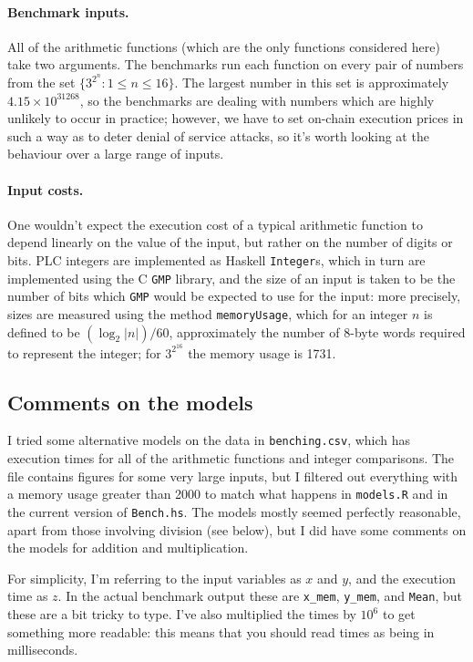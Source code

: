 \documentclass[a4paper]{article}
\begin{document}
\paragraph{Benchmark inputs.}  All of the arithmetic functions (which
are the only functions considered here) take two arguments.  The
benchmarks run each function on every pair of numbers from the set
$\{3^{2^n}: 1 \leq n \leq 16\}$.  The largest number in this
set is approximately $4.15 \times 10^{31268}$, so the benchmarks are dealing
with numbers which are highly unlikely to occur in practice; however,
we have to set on-chain execution prices in such a way as to deter denial 
of service attacks, so it's worth looking at the behaviour over a large
range of inputs.

\paragraph{Input costs.}  One wouldn't expect the execution cost
of a typical arithmetic function to depend linearly on the value of the
input, but rather on the number of digits or bits.  PLC integers are
implemented as Haskell \verb|Integer|s, which in turn are implemented
using the C \texttt{GMP} library, and the size of an input is taken to
be the number of bits which \texttt{GMP} would be expected to use for the
input: more precisely, sizes are measured using the method
\verb|memoryUsage|, which for an integer $n$ is defined to be $(\log_2
|n|) / 60$, approximately the number of 8-byte words required to
represent the integer; for $3^{2^{16}}$ the memory usage is 1731.

\subsection*{Comments on the models}
I tried some alternative models on the data in \verb|benching.csv|,
which has execution times for all of the arithmetic functions and
integer comparisons.  The file contains figures for some very large
inputs, but I filtered out everything with a memory usage greater than
2000 to match what happens in \verb|models.R| and in the current
version of \verb|Bench.hs|.  The models mostly seemed perfectly
reasonable, apart from those involving division (see below), but I
did have some comments on the models for addition and multiplication.

For simplicity, I'm referring to the input variables as $x$ and $y$,
and the execution time as $z$.  In the actual benchmark output these
are \verb|x_mem|, \verb|y_mem|, and \verb|Mean|, but these are a bit
tricky to type.  I've also multiplied the times by $10^6$ to get
something more readable: this means that you should read times as
being in milliseconds.
\end{document}
